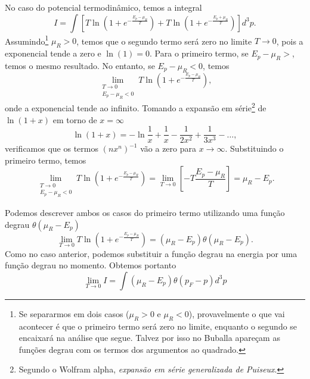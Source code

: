 No caso do potencial termodinâmico, temos a integral
\begin{equation}
	I = \int [T \ln(1+e^{-\frac{E_p - \mu_R}{T}}) + T\ln(1+e^{-\frac{E_p + \mu_R}{T}})] d^3p.
\end{equation}
%
Assumindo\footnote{Se separarmos em dois casos ($\mu_R > 0$ e $\mu_R < 0$), provavelmente o que vai acontecer é que o primeiro termo será zero no limite, enquanto o segundo se encaixará na análise que segue. Talvez por isso no Buballa apareçam as funções degrau com os termos dos argumentos ao quadrado.} $\mu_R > 0$, temos que o segundo termo será zero no limite $T \to 0$, pois a exponencial tende a zero e $\ln(1) = 0$. Para o primeiro termo, se $E_p - \mu_R >$, temos o mesmo resultado. No entanto, se $E_p - \mu_R < 0$, temos
\begin{equation}
	\lim_{\substack{T \to 0 \\ E_p - \mu_R < 0}} T \ln(1+e^{-\frac{E_p - \mu_R}{T}}),
\end{equation}
%
onde a exponencial tende ao infinito. Tomando a expansão em série\footnote{Segundo o Wolfram alpha, \emph{expansão em série generalizada de Puiseux}.} de $\ln(1 + x)$ em torno de $x = \infty$
\begin{equation}
	\ln(1 + x) = -\ln\frac{1}{x} + \frac{1}{x} - \frac{1}{2x^2} + \frac{1}{3x^3} - \dots,
\end{equation}
%
verificamos que os termos $(n x^n)^{-1}$ vão a zero para $x \to \infty$. Substituindo o primeiro termo, temos
\begin{equation}
	\lim_{\substack{T \to 0 \\ E_p - \mu_R < 0}} T \ln(1+e^{-\frac{E_p - \mu_R}{T}}) = \lim_{T \to 0} \left[-T \frac{E_p - \mu_R}{T} \right] = \mu_R - E_p.
\end{equation}
%

Podemos descrever ambos os casos do primeiro termo utilizando uma função degrau $\theta(\mu_R - E_p)$
\begin{equation}
	\lim_{T \to 0} T \ln(1+e^{-\frac{E_p - \mu_R}{T}}) = (\mu_R - E_p)\theta(\mu_R - E_p).
\end{equation}
%
Como no caso anterior, podemos substituir a função degrau na energia por uma função degrau no momento. Obtemos portanto
\begin{equation}
	\lim_{T \to 0} I = \int (\mu_R - E_p)\theta(p_F - p) d^3p
\end{equation}
%

